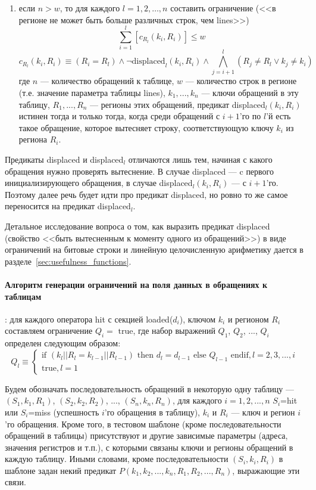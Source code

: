 \begin{enumerate}
    \item если $n > w$, то для каждого $l = 1, 2, \dots, n$ составить
ограничение (<<в регионе не может быть больше различных строк, чем lines>>)
$$\sum_{i=1}^l [c_{R_l} (k_i, R_i)] \leqslant w$$
$$c_{R_l} (k_i, R_i) \equiv (R_i = R_l ) \wedge \neg \mbox{displaced}_l (k_i, R_i) \wedge \bigwedge_{j=i+1}^{l} (R_j \neq R_l \vee k_j \neq k_i)$$
где $n$ --- количество обращений к таблице, $w$ --- количество строк в регионе
(т.е. значение параметра таблицы lines), $k_1, ..., k_n$ --- ключи обращений в
эту таблицу, $R_1, ..., R_n$ --- регионы этих обращений, предикат displaced$_l (k_i, R_i)$ истинен тогда и только тогда, когда среди обращений с $i+1$'го по $l$'й есть такое обращение, которое вытесняет строку, соответствующую ключу $k_i$ из региона $R_i$.
\end{enumerate}

Предикаты displaced и displaced$_l$ отличаются лишь тем, начиная с какого обращения нужно проверять вытеснение. В случае displaced --- c первого инициализирующего обращения, в случае displaced$_l(k_i, R_i)$ --- с $i+1$'го. Поэтому далее речь будет идти про предикат displaced, но ровно то же самое переносится на предикат displaced$_l$.

Детальное исследование вопроса о том, как выразить предикат displaced (свойство <<быть вытесненным к моменту одного из обращений>>) в виде ограничений на битовые строки и линейную целочисленную арифметику дается в разделе~\ref{sec:usefulness_functions}.

\paragraph{Алгоритм генерации ограничений на поля данных в обращениях к таблицам}:
для каждого оператора hit с секцией loaded($d_i$), ключом $k_i$ и регионом $R_i$ составляем ограничение $Q_i = \mbox{~true}$, где набор выражений $Q_1$, $Q_2$, ..., $Q_i$ определен следующим образом:
$$Q_l \equiv \begin{cases} \mbox{if~} (k_l||R_l = k_{l-1}||R_{l-1}) \mbox{~then~} d_l = d_{l-1} \mbox{~else~} Q_{l-1} \mbox{~endif}, l{=}2,3,...,i\\
\mbox{true}, l{=}1\end{cases}$$

Будем обозначать последовательность обращений в некоторую одну таблицу --- $(S_1, k_1, R_1)$, $(S_2, k_2, R_2)$, ..., $(S_n, k_n, R_n)$, для каждого $i = 1, 2, ..., n$ $S_i${=}hit или $S_i${=}miss (успешность $i$'го обращения в таблицу), $k_i$ и $R_i$ --- ключ и регион $i$'го обращения. Кроме того, в тестовом шаблоне (кроме последовательности обращений в таблицы) присутствуют и другие зависимые параметры (адреса, значения регистров и т.п.), с которыми связаны ключи и регионы обращений в каждую таблицу. Иными словами, кроме последовательности $(S_i, k_i, R_i)$ в шаблоне задан некий предикат $P(k_1, k_2, ..., k_n, R_1, R_2, ..., R_n)$, выражающие эти связи.

